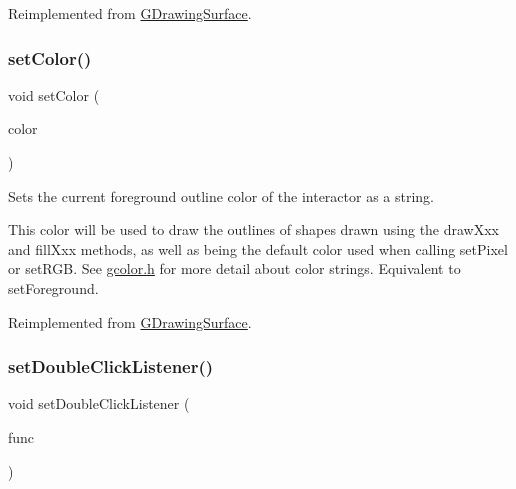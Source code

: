 Reimplemented from \mbox{\hyperlink{classGDrawingSurface_a75b9cb32ff80bf061791beb01a8433d0}{G\+Drawing\+Surface}}.

\mbox{\label{classGCanvas_ad148324da1b0340e84e24dffa577ffca}} 
\subsubsection{\texorpdfstring{set\+Color()}{setColor()}\hspace{0.1cm}{\footnotesize\ttfamily [2/2]}}
{\footnotesize\ttfamily void set\+Color (\begin{DoxyParamCaption}\item[{const std\+::string \&}]{color }\end{DoxyParamCaption})\hspace{0.3cm}{\ttfamily [virtual]}}



Sets the current foreground outline color of the interactor as a string. 

This color will be used to draw the outlines of shapes drawn using the draw\+Xxx and fill\+Xxx methods, as well as being the default color used when calling set\+Pixel or set\+R\+GB. See \mbox{\hyperlink{gcolor_8h_source}{gcolor.\+h}} for more detail about color strings. Equivalent to set\+Foreground. 

Reimplemented from \mbox{\hyperlink{classGDrawingSurface_a61374df6c11b52cfbb0815decdbaebc6}{G\+Drawing\+Surface}}.

\mbox{\label{classGCanvas_ac29f9a3462458e165fae3a1f046ee77a}} 
\subsubsection{\texorpdfstring{set\+Double\+Click\+Listener()}{setDoubleClickListener()}\hspace{0.1cm}{\footnotesize\ttfamily [1/2]}}
{\footnotesize\ttfamily void set\+Double\+Click\+Listener (\begin{DoxyParamCaption}\item[{G\+Event\+Listener}]{func }\end{DoxyParamCaption})\hspace{0.3cm}{\ttfamily [virtual]}}



